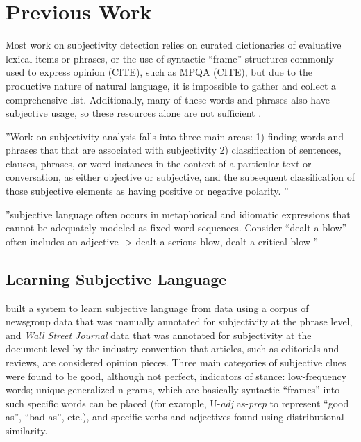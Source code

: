 \section{Previous Work}

Most work on subjectivity detection relies on curated dictionaries of evaluative lexical items or phrases, or the use of syntactic ``frame'' structures commonly used to express opinion (CITE), such as MPQA (CITE), but due to the productive nature of natural language, it is impossible to gather and collect a comprehensive list.  Additionally, many of these words and phrases also have subjective usage, so these resources alone are not sufficient \citep{wiebe2004learning}.  



''Work on subjectivity analysis falls into three main areas:
1) finding words and phrases that that are associated with subjectivity
2) classification of sentences, clauses, phrases, or word instances in the context of a particular text or conversation, as either objective or subjective, and the subsequent classification of those subjective elements as having positive or negative polarity. '' \citep{wiebe2006word}

''subjective language often occurs in metaphorical and idiomatic expressions that cannot be adequately modeled as fixed word sequences.  Consider ``dealt a blow'' often includes an adjective -> dealt a serious blow, dealt a critical blow '' \citep{wiebe2011finding}




\subsection{Learning Subjective Language} 

\cite{wiebe2004learning} built a system to learn subjective language from data using a corpus of newsgroup data that was manually annotated for subjectivity at the phrase level, and \emph{Wall Street Journal} data that was annotated for subjectivity at the document level by the industry convention that articles, such as editorials and reviews, are considered opinion pieces.  Three main categories of subjective clues were found to be good, although not perfect, indicators of stance: low-frequency words; unique-generalized n-grams, which are basically syntactic ``frames'' into such specific words can be placed (for example, U-\emph{adj} as-\emph{prep} to represent ``good as'', ``bad as'', etc.), and specific verbs and adjectives found using distributional similarity.


